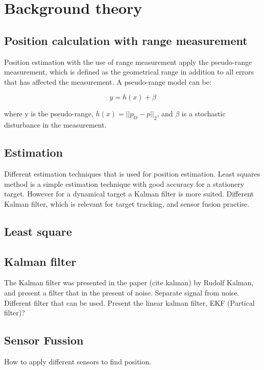 \chapter{Background theory}
\section{Position calculation with range measurement}

Position estimation with the use of range measurement apply the pseudo-range measurement, which is defined as the geometrical range in addition to all errors that has affected the measurement. A pseudo-range model can be:

\begin{equation}
y = h(x) + \beta
\end{equation}

where y is the pseudo-range, $h(x) = ||p_O - p||_2$, and $\beta$ is a stochastic disturbance in the measurement.

\section{Estimation}
Different estimation techniques that is used for position estimation. Least squares method is a simple estimation technique with good accuracy for a stationery target. However for a dynamical target a Kalman filter is more suited. Different Kalman filter, which is relevant for target tracking, and sensor fusion practise.

\section{Least square}

\section{Kalman filter}
The Kalman filter was presented in the paper (cite kalman) by Rudolf Kalman, and present a filter that in the present of noise. Separate signal from noise.
Different filter that can be used. Present the linear kalman filter, EKF (Partical filter)?

\section{Sensor Fussion}
How to apply different sensors to find position.
